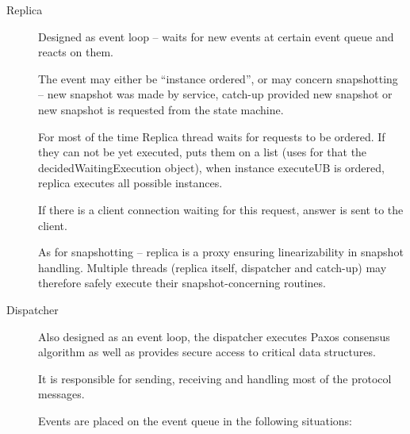 \begin{description}
  \item[Replica] \hfill
    
    Designed as event loop -- waits for new events at certain event queue and reacts on them.

    The event may either be ``instance ordered'', or may concern snapshotting -- new snapshot was made by service, catch-up provided new snapshot or new snapshot is requested from the state machine.

    For most of the time Replica thread waits for requests to be ordered. If they can not be yet executed, puts them on a list (uses for that the decidedWaitingExecution object), when instance executeUB is ordered, replica executes all possible instances.
    
    If there is a client connection waiting for this request, answer is sent to the client.
    
    As for snapshotting -- replica is a proxy ensuring linearizability in snapshot handling.
    Multiple threads (replica itself, dispatcher and catch-up) may therefore safely execute their snapshot-concerning routines.
    

  \item[Dispatcher] \hfill
    
    Also designed as an event loop, the dispatcher executes Paxos consensus algorithm as well as provides secure access to critical data structures.

    It is responsible for sending, receiving and handling most of the protocol messages. 
    
    Events are placed on the event queue in the following situations:
    

\end{description}
